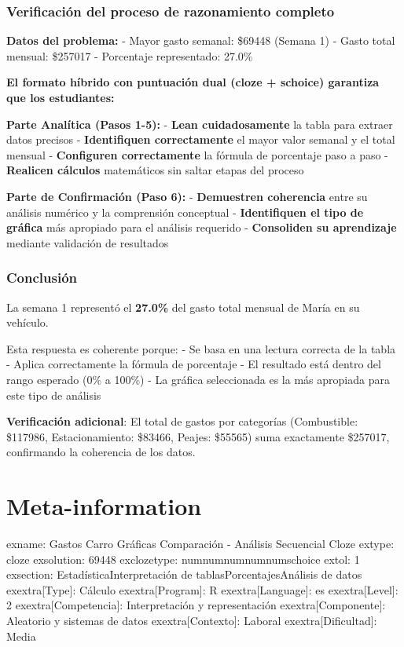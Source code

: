 \documentclass[
]{article}
\begin{document}
\subsubsection{Verificación del proceso de razonamiento
completo}\label{verificaciuxf3n-del-proceso-de-razonamiento-completo}

\textbf{Datos del problema:} - Mayor gasto semanal: \$69448 (Semana 1) -
Gasto total mensual: \$257017 - Porcentaje representado: 27.0\%

\textbf{El formato híbrido con puntuación dual (cloze + schoice)
garantiza que los estudiantes:}

\textbf{Parte Analítica (Pasos 1-5):} - \textbf{Lean cuidadosamente} la
tabla para extraer datos precisos - \textbf{Identifiquen correctamente}
el mayor valor semanal y el total mensual - \textbf{Configuren
correctamente} la fórmula de porcentaje paso a paso - \textbf{Realicen
cálculos} matemáticos sin saltar etapas del proceso

\textbf{Parte de Confirmación (Paso 6):} - \textbf{Demuestren
coherencia} entre su análisis numérico y la comprensión conceptual -
\textbf{Identifiquen el tipo de gráfica} más apropiado para el análisis
requerido - \textbf{Consoliden su aprendizaje} mediante validación de
resultados

\subsubsection{Conclusión}\label{conclusiuxf3n}

La semana 1 representó el \textbf{27.0\%} del gasto total mensual de
María en su vehículo.

Esta respuesta es coherente porque: - Se basa en una lectura correcta de
la tabla - Aplica correctamente la fórmula de porcentaje - El resultado
está dentro del rango esperado (0\% a 100\%) - La gráfica seleccionada
es la más apropiada para este tipo de análisis

\textbf{Verificación adicional}: El total de gastos por categorías
(Combustible: \$117986, Estacionamiento: \$83466, Peajes: \$55565) suma
exactamente \$257017, confirmando la coherencia de los datos.

\section{Meta-information}\label{meta-information}

exname: Gastos Carro Gráficas Comparación - Análisis Secuencial Cloze
extype: cloze exsolution:
69448
exclozetype:
num\textbar num\textbar num\textbar num\textbar num\textbar schoice
extol: 1 exsection:
Estadística\textbar Interpretación de
tablas\textbar Porcentajes\textbar Análisis de datos exextra{[}Type{]}:
Cálculo exextra{[}Program{]}: R exextra{[}Language{]}: es
exextra{[}Level{]}: 2 exextra{[}Competencia{]}: Interpretación y
representación exextra{[}Componente{]}: Aleatorio y sistemas de datos
exextra{[}Contexto{]}: Laboral exextra{[}Dificultad{]}: Media
\end{document}

